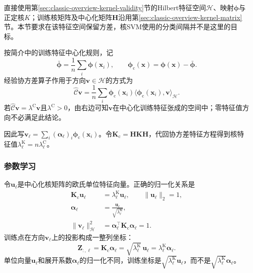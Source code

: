 直接使用第\ref{sec:classic-overview-kernel-validity}节的Hilbert特征空间$\mathcal{H}$、映射$\bm{\phi}$与正定核$K$；训练核矩阵及中心化矩阵$\bm{H}$沿用第\ref{sec:classic-overview-kernel-matrix}节。本节要求在该特征空间保留方差，核SVM使用的分类间隔并不是这里的目标。

按简介中的训练特征中心化规则，记
\[
  \bar{\bm{\phi}}=\frac1n\sum_i\bm{\phi}(\bm{x}_i),
  \qquad
  \bm{\phi}_{\mathrm{c}}(\bm{x})=\bm{\phi}(\bm{x})-\bar{\bm{\phi}}.
\]
经验协方差算子作用于方向$\bm{v}\in\mathcal{H}$的方式为
\begin{equation}
  \label{eq:dim-kpca-covariance}
  \widehat{\mathcal{C}}\bm{v}
  =\frac1n\sum_i
    \bm{\phi}_{\mathrm{c}}(\bm{x}_i)
    \langle\bm{\phi}_{\mathrm{c}}(\bm{x}_i),\bm{v}\rangle_{\mathcal{H}}.
\end{equation}
若$\widehat{\mathcal{C}}\bm{v}=\lambda^{\mathrm{C}}\bm{v}$且$\lambda^{\mathrm{C}}>0$，由右边可知$\bm{v}$在中心化训练特征张成的空间中；零特征值方向不必满足此结论。

因此写$\bm{v}_\ell=\sum_i(\bm{\alpha}_\ell)_i\bm{\phi}_{\mathrm{c}}(\bm{x}_i)$。令$\bm{K}_{\mathrm{c}}=\bm{H}\bm{K}\bm{H}$，代回协方差特征方程得到核特征值$\lambda_\ell^{\mathrm{K}}=n\lambda_\ell^{\mathrm{C}}$。

\subsubsection{参数学习}

令$\bm{u}_\ell$是中心化核矩阵的欧氏单位特征向量。正确的归一化关系是
\begin{equation}
  \label{eq:dim-kpca-normalization}
  \begin{aligned}
    \bm{K}_{\mathrm{c}}\bm{u}_\ell
      &=\lambda_\ell^{\mathrm{K}}\bm{u}_\ell,
      \qquad\lVert\bm{u}_\ell\rVert_2=1,\\
    \bm{\alpha}_\ell
      &=\frac{\bm{u}_\ell}{\sqrt{\lambda_\ell^{\mathrm{K}}}},\\
    \lVert\bm{v}_\ell\rVert_{\mathcal{H}}^2
      &=\bm{\alpha}_\ell^{\top}\bm{K}_{\mathrm{c}}\bm{\alpha}_\ell=1.
  \end{aligned}
\end{equation}
训练点在方向$\bm{v}_\ell$上的投影构成一整列坐标：
\begin{equation}
  \label{eq:dim-kpca-training}
  \bm{Z}_{:,\ell}
  =\bm{K}_{\mathrm{c}}\bm{\alpha}_\ell
  =\sqrt{\lambda_\ell^{\mathrm{K}}}\,\bm{u}_\ell
  =\lambda_\ell^{\mathrm{K}}\bm{\alpha}_\ell.
\end{equation}
单位向量$\bm{u}_\ell$和展开系数$\bm{\alpha}_\ell$的归一化不同，训练坐标是$\sqrt{\lambda_\ell^{\mathrm{K}}}\bm{u}_\ell$，而不是$\sqrt{\lambda_\ell^{\mathrm{K}}}\bm{\alpha}_\ell$。

